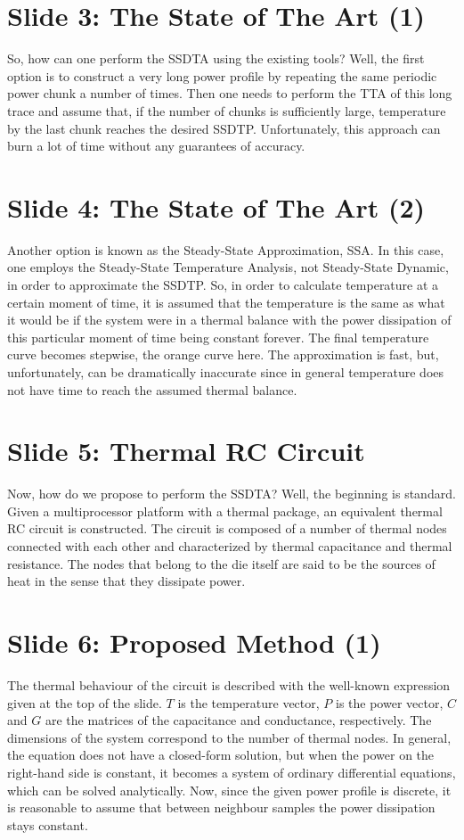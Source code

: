 \documentclass[11pt,a4paper]{article}
\begin{document}
\section{Slide 3: The State of The Art (1)}
So, how can one perform the SSDTA using the existing tools? Well, the first option is to construct a very long power profile by repeating the same periodic power chunk a number of times. Then one needs to perform the TTA of this long trace and assume that, if the number of chunks is sufficiently large, temperature by the last chunk reaches the desired SSDTP. Unfortunately, this approach can burn a lot of time without any guarantees of accuracy.

\section{Slide 4: The State of The Art (2)}
Another option is known as the Steady-State Approximation, SSA. In this case, one employs the Steady-State Temperature Analysis, not Steady-State Dynamic, in order to approximate the SSDTP. So, in order to calculate temperature at a certain moment of time, it is assumed that the temperature is the same as what it would be if the system were in a thermal balance with the power dissipation of this particular moment of time being constant forever. The final temperature curve becomes stepwise, the orange curve here. The approximation is fast, but, unfortunately, can be dramatically inaccurate since in general temperature does not have time to reach the assumed thermal balance.

\section{Slide 5: Thermal RC Circuit}
Now, how do we propose to perform the SSDTA? Well, the beginning is standard. Given a multiprocessor platform with a thermal package, an equivalent thermal RC circuit is constructed. The circuit is composed of a number of thermal nodes connected with each other and characterized by thermal capacitance and thermal resistance. The nodes that belong to the die itself are said to be the sources of heat in the sense that they dissipate power.

\section{Slide 6: Proposed Method (1)}
The thermal behaviour of the circuit is described with the well-known expression given at the top of the slide. $T$ is the temperature vector, $P$ is the power vector, $C$ and $G$ are the matrices of the capacitance and conductance, respectively. The dimensions of the system correspond to the number of thermal nodes. In general, the equation does not have a closed-form solution, but when the power on the right-hand side is constant, it becomes a system of ordinary differential equations, which can be solved analytically. Now, since the given power profile is discrete, it is reasonable to assume that between neighbour samples the power dissipation stays constant.
\end{document}
